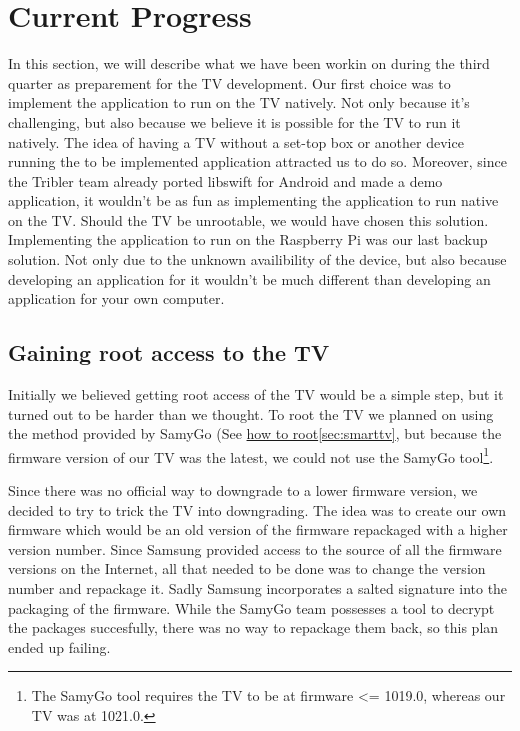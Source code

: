 \chapter*{Current Progress}
\label{chap:current}

In this section, we will describe what we have been workin on during the third quarter as preparement for the TV development.
Our first choice was to implement the application to run on the TV natively.
Not only because it's challenging, but also because we believe it is possible for the TV to run it natively.
The idea of having a TV without a set-top box or another device running the to be implemented application attracted us to do so.
Moreover, since the Tribler team already ported libswift for Android and made a demo application,
it wouldn't be as fun as implementing the application to run native on the TV.
Should the TV be unrootable, we would have chosen this solution.
Implementing the application to run on the Raspberry Pi was our last backup solution.
Not only due to the unknown availibility of the device,
but also because developing an application for it wouldn't be much different than developing an application for your own computer.

\section*{Gaining root access to the TV}
Initially we believed getting root access of the TV would be a simple step,
but it turned out to be harder than we thought.
To root the TV we planned on using the method provided by SamyGo (See \hyperref[sec:smarttv]{how to root\ref*{sec:smarttv}},
but because the firmware version of our TV was the latest,
we could not use the SamyGo tool\footnote{The SamyGo tool requires the TV to be at firmware <= 1019.0, whereas our TV was at 1021.0.}.

Since there was no official way to downgrade to a lower firmware version,
we decided to try to trick the TV into downgrading.
The idea was to create our own firmware which would be an old version of the firmware repackaged with a higher version number.
Since Samsung provided access to the source of all the firmware versions on the Internet,
all that needed to be done was to change the version number and repackage it.
Sadly Samsung incorporates a salted signature into the packaging of the firmware.
While the SamyGo team possesses a tool to decrypt the packages succesfully,
there was no way to repackage them back, so this plan ended up failing.

